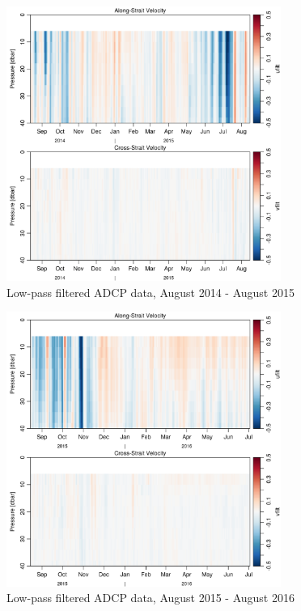 \documentclass[12pt]{dforeport}
\begin{document}
\begin{figure}  
\centering
\includegraphics[width = 0.8\textwidth]{./figures/17_madcp_lpf_2014_2015.png}
\caption[Low-pass filtered ADCP data, 2014-2015]{Low-pass filtered ADCP data, August 2014 - August 2015}
\label{f:madcp_lpf_2014_2015}
\end{figure}

\begin{figure}  
\centering
\includegraphics[width = 0.8\textwidth]{./figures/18_madcp_lpf_2015_2016.png}
\caption[Low-pass filtered ADCP data, 2015-2016]{Low-pass filtered ADCP data, August 2015 - August 2016}
\label{f:madcp_lpf_2015_2016}
\end{figure}
\end{document}
